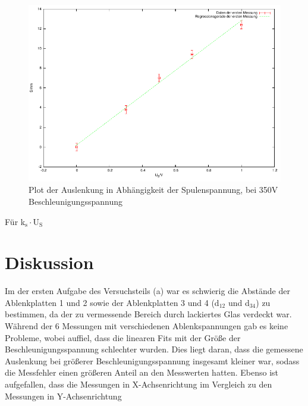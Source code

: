 \documentclass[12pt]{scrartcl}
\begin{document}
\begin{figure}[htbp] 
  \centering
    \includegraphics[scale = 1]{b_3.pdf}
  	\caption[Plot der Auslenkung in Abhängigkeit der Spulenspannung, bei 350V Beschleunigungsspannung]{Plot der Auslenkung in Abhängigkeit der Spulenspannung, bei 350V Beschleunigungsspannung}
  \label{fig:x_1}
\end{figure}

Für k$_\text{s} \cdot \text{U}_\text{S}$
\newpage
\section{Diskussion}

Im der ersten Aufgabe des Versuchsteils (a)
war es schwierig die Abstände der Ablenkplatten 1 und 2 sowie der Ablenkplatten 3 und 4 (d$_{12}$ und d$_{34}$) zu bestimmen, da der zu vermessende Bereich  durch lackiertes Glas verdeckt war.\\
Während der 6 Messungen mit verschiedenen Ablenkspannungen gab es keine Probleme, wobei auffiel, dass die linearen Fits mit der Größe der Beschleunigungsspannung schlechter wurden.
Dies liegt daran, dass die gemessene Auslenkung bei größerer Beschleunigungsspannung insgesamt kleiner war, sodass die Messfehler einen größeren Anteil an den Messwerten hatten.
Ebenso ist aufgefallen, dass die Messungen in X-Achsenrichtung im Vergleich zu den Messungen in Y-Achsenrichtung
 
\end{document}

